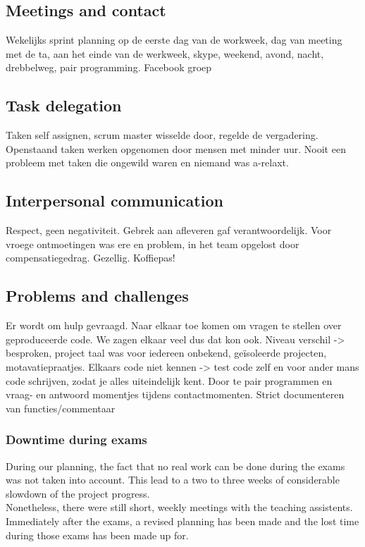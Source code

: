 \documentclass[10pt,a4paper]{report}
\begin{document}
		\subsection{Meetings and contact}
Wekelijks sprint planning op de eerste dag van de workweek, dag van meeting met de ta, aan het einde van de werkweek, skype, weekend, avond, nacht, drebbelweg, pair programming. Facebook groep

		\subsection{Task delegation}
Taken self assignen, scrum master wisselde door, regelde de vergadering. Openstaand taken werken opgenomen door mensen met minder uur. Nooit een probleem met taken die ongewild waren en niemand was a-relaxt. 

		\subsection{Interpersonal communication}
Respect, geen negativiteit. Gebrek aan afleveren gaf verantwoordelijk. Voor vroege ontmoetingen was ere en problem, in het team opgelost door compensatiegedrag. Gezellig. Koffiepas! 

		\subsection{Problems and challenges}
Er wordt om hulp gevraagd. Naar elkaar toe komen om vragen te stellen over geproduceerde code. We zagen elkaar veel dus dat kon ook.
	Niveau verschil -> besproken, project taal was voor iedereen onbekend, geïsoleerde projecten, motavatiepraatjes.
Elkaars code niet kennen -> test code zelf en voor ander mans code schrijven, zodat je alles uiteindelijk kent. Door te pair programmen en vraag- en antwoord momentjes tijdens contactmomenten. Strict documenteren van functies/commentaar
			\subsubsection*{Downtime during exams}
				During our planning, the fact that no real work can be done during the exams was not taken into account. This lead to a two to three weeks of considerable slowdown of the project progress.\\
				Nonetheless, there were still short, weekly meetings with the teaching assistents. Immediately after the exams, a revised planning has been made and the lost time during those exams has been made up for.
\end{document}
